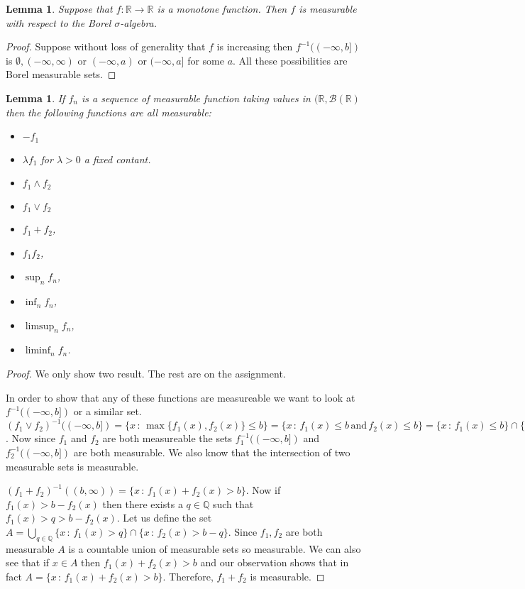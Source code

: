 \documentclass[11pt]{article}
\newtheorem{lem}[thm]{Lemma}
\theoremstyle{definition}
\theoremstyle{remark}
\begin{document}
\begin{lem}
Suppose that $f: \mathbb{R} \rightarrow \mathbb{R}$ is a monotone function. Then $f$ is measurable with respect to the Borel $\sigma$-algebra.
\end{lem}
\begin{proof}
Suppose without loss of generality that $f$ is increasing then $f^{-1}((-\infty, b])$ is $\emptyset, (-\infty, \infty)$ or $(-\infty, a)$ or $(-\infty, a]$ for some $a$. All these possibilities are Borel measurable sets.
\end{proof}

\begin{lem}
If $f_n$ is a sequence of measurable function taking values in $(\mathbb{R}, \mathcal{B}(\mathbb{R})$ then the following functions are all measurable:
\begin{itemize}
\item $-f_1$
\item $\lambda f_1$ for $\lambda >0$ a fixed contant.
\item $f_1 \wedge f_2$
\item $f_1 \vee f_2$
\item $f_1+f_2$,
\item $f_1 f_2$,
\item $\sup_n f_n$,
\item $\inf_n f_n$,
\item $\limsup_n f_n$,
\item $\liminf_n f_n$.
\end{itemize}
\end{lem}
\begin{proof} We only show two result. The rest are on the assignment.

 In order to show that any of these functions are measureable we want to look at $f^{-1}((-\infty, b])$ or a similar set. $(f_1 \vee f_2)^{-1}((-\infty, b]) = \{ x \,:\, \max\{f_1(x), f_2(x)\} \leq b\} = \{ x \,:\, f_1(x) \leq b \, \mbox{and} \, f_2(x) \leq b\} = \{ x \,:\, f_1(x) \leq b \} \cap \{x \,:\, f_2(x) \leq b\} = f_1^{-1}((-\infty, b]) \cap f_2^{-1}((-\infty, b])$. Now since $f_1$ and $f_2$ are both measureable the sets $f_1^{-1}((-\infty, b])$ and $f_2^{-1}((-\infty, b])$ are both measurable. We also know that the intersection of two measurable sets is measurable.

$(f_1+f_2)^{-1}((b,\infty)) = \{ x \,:\, f_1(x) + f_2(x) > b \}$. Now if $f_1(x) > b-f_2(x)$ then there exists a $q \in \mathbb{Q}$ such that $f_1(x)> q > b - f_2(x)$. Let us define the set $A= \bigcup_{q \in \mathbb{Q}} \{ x \,:\, f_1(x) > q\} \cap \{ x\,:\, f_2(x) > b-q\}$. Since $f_1,f_2$ are both measurable $A$ is a countable union of measurable sets so measurable. We can also see that if $x \in A$ then $f_1(x) + f_2(x) > b$ and our observation shows that in fact $A=  \{ x \,:\, f_1(x) + f_2(x) > b \}$. Therefore, $f_1+f_2$ is measurable.
\end{proof}
\end{document}
